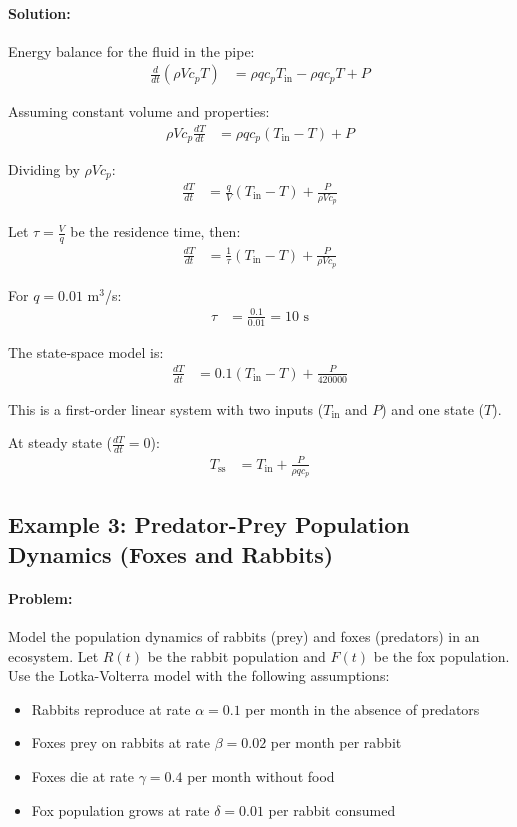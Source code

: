 \documentclass[11pt,a4paper]{article}
\begin{document}
\paragraph{Solution:}

Energy balance for the fluid in the pipe:
\begin{align}
\frac{d}{dt}(\rho V c_p T) &= \rho q c_p T_{\text{in}} - \rho q c_p T + P
\end{align}

Assuming constant volume and properties:
\begin{align}
\rho V c_p \frac{dT}{dt} &= \rho q c_p (T_{\text{in}} - T) + P
\end{align}

Dividing by $\rho V c_p$:
\begin{align}
\frac{dT}{dt} &= \frac{q}{V}(T_{\text{in}} - T) + \frac{P}{\rho V c_p}
\end{align}

Let $\tau = \frac{V}{q}$ be the residence time, then:
\begin{align}
\frac{dT}{dt} &= \frac{1}{\tau}(T_{\text{in}} - T) + \frac{P}{\rho V c_p}
\end{align}

For $q = 0.01$ m$^3$/s:
\begin{align}
\tau &= \frac{0.1}{0.01} = 10 \text{ s}
\end{align}

The state-space model is:
\begin{align}
\frac{dT}{dt} &= 0.1(T_{\text{in}} - T) + \frac{P}{420000}
\end{align}

This is a first-order linear system with two inputs ($T_{\text{in}}$ and $P$) and one state ($T$).

At steady state ($\frac{dT}{dt} = 0$):
\begin{align}
T_{\text{ss}} &= T_{\text{in}} + \frac{P}{\rho q c_p}
\end{align}

\subsection{Example 3: Predator-Prey Population Dynamics (Foxes and Rabbits)}

\paragraph{Problem:} Model the population dynamics of rabbits (prey) and foxes (predators) in an ecosystem. Let $R(t)$ be the rabbit population and $F(t)$ be the fox population. Use the Lotka-Volterra model with the following assumptions:
\begin{itemize}
\item Rabbits reproduce at rate $\alpha = 0.1$ per month in the absence of predators
\item Foxes prey on rabbits at rate $\beta = 0.02$ per month per rabbit
\item Foxes die at rate $\gamma = 0.4$ per month without food
\item Fox population grows at rate $\delta = 0.01$ per rabbit consumed
\end{itemize}
\end{document}
